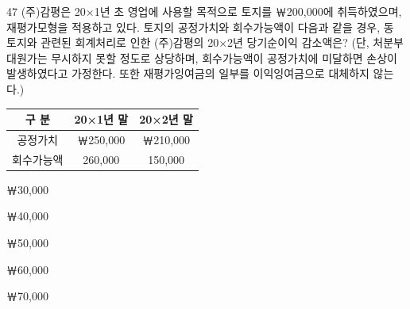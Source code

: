 \begin{question}{47}
(주)감평은 20×1년 초 영업에 사용할 목적으로 토지를 ￦200,000에 취득하였으며, 재평가모형을 적용하고 있다. 토지의 공정가치와 회수가능액이 다음과 같을 경우, 동 토지와 관련된 회계처리로 인한 (주)감평의 20×2년 당기순이익 감소액은? (단, 처분부대원가는 무시하지 못할 정도로 상당하며, 회수가능액이 공정가치에 미달하면 손상이 발생하였다고 가정한다. 또한 재평가잉여금의 일부를 이익잉여금으로 대체하지 않는다.)
\par{\small\centering
\begin{tabular}{|c|c|c|}\hline
구 분 & 20×1년 말 & 20×2년 말 \\ \hline
공정가치 & ￦250,000 & ￦210,000 \\ \hline
회수가능액 & 260,000 & 150,000 \\ \hline
\end{tabular}
\par}
\begin{choices}
  \item ￦30,000
  \item ￦40,000
  \item ￦50,000
  \item ￦60,000
  \item ￦70,000
\end{choices}
\end{question}
